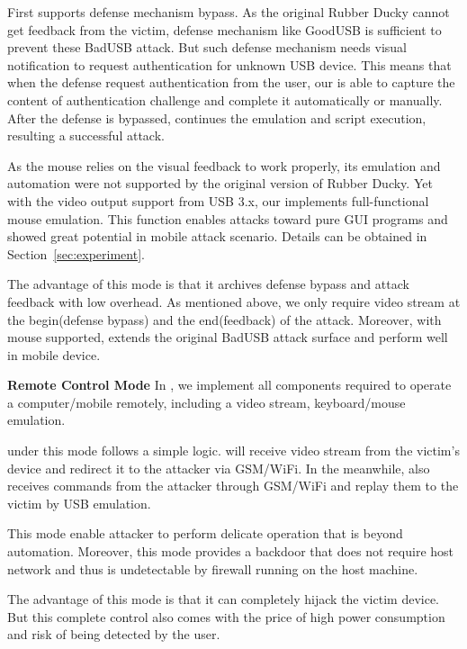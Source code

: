 First \tool supports defense mechanism bypass. As the original Rubber Ducky cannot get feedback from the victim, defense mechanism like GoodUSB \cite{tian2015defending} is sufficient to prevent these BadUSB attack. But such defense mechanism needs visual notification to request authentication for unknown USB device. This means that when the defense request authentication from the user, our \tool is able to capture the content of authentication challenge and complete it automatically or manually. After the defense is bypassed, \tool continues the emulation and script execution, resulting a successful attack.

As the mouse relies on the visual feedback to work properly, its emulation and automation were not supported by the original version of Rubber Ducky. Yet with the video output support from USB 3.x, our \tool implements full-functional mouse emulation. This function enables attacks toward pure GUI programs and showed great potential in mobile attack scenario. Details can be obtained in Section~\ref{sec:experiment}.

The advantage of this mode is that it archives defense bypass and attack feedback with low overhead. As mentioned above, we only require video stream at the begin(defense bypass) and the end(feedback) of the attack. Moreover, with mouse supported, \tool extends the original BadUSB attack surface and perform well in mobile device.

\textbf{Remote Control Mode}
In \tool, we implement all components required to operate a computer/mobile remotely, including a video stream, keyboard/mouse emulation.

\tool under this mode follows a simple logic. \tool will receive video stream from the victim's device and redirect it to the attacker via GSM/WiFi. In the meanwhile, \tool also receives commands from the attacker through GSM/WiFi and replay them to the victim by USB emulation.

This mode enable attacker to perform delicate operation that is beyond automation. Moreover, this mode provides a backdoor that does not require host network and thus is undetectable by firewall running on the host machine.

The advantage of this mode is that it can completely hijack the victim device. But this complete control also comes with the price of high power consumption and risk of being detected by the user.

